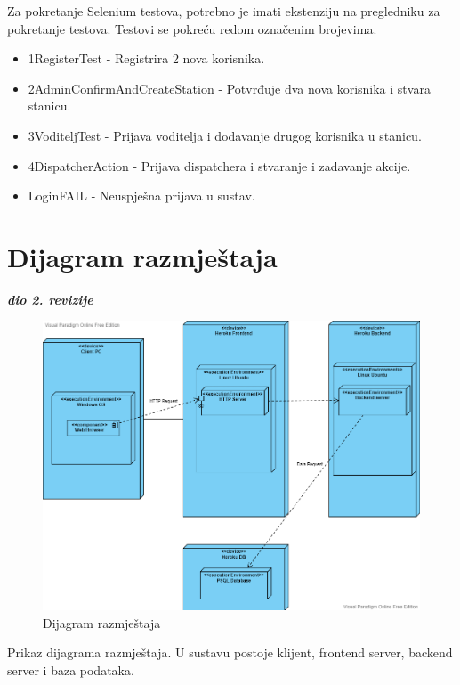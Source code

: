 			 Za pokretanje Selenium testova, potrebno je imati ekstenziju na pregledniku za pokretanje testova. Testovi se pokreću redom označenim brojevima.
			 \begin{itemize}
			 	\item 1RegisterTest - Registrira 2 nova korisnika.
			 	\item 2AdminConfirmAndCreateStation - Potvrđuje dva nova korisnika i stvara stanicu.
			 	\item 3VoditeljTest - Prijava voditelja i dodavanje drugog korisnika u stanicu.
			 	\item 4DispatcherAction - Prijava dispatchera i stvaranje i zadavanje akcije.
			 	\item LoginFAIL - Neuspješna prijava u sustav.
			 \end{itemize}

			
			\eject 
		
		
		\section{Dijagram razmještaja}
			
			\textbf{\textit{dio 2. revizije}}
			
			 \begin{figure}[H]
			 	\includegraphics[scale=0.45]{slike/razmjestaj.PNG}
			 	\centering
			 	\caption{Dijagram razmještaja}
			 	\label{fig:razmještaj}
			 \end{figure}
			Prikaz dijagrama razmještaja. U sustavu postoje klijent, frontend server, backend server i baza podataka.
			
